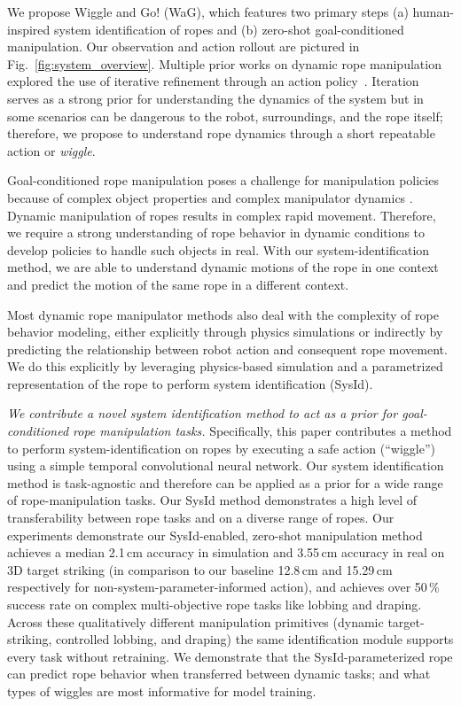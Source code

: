\documentclass[conference]{IEEEtran}
\newcommand{\waglong}{Wiggle and Go!}
\newcommand{\wag}{WaG}
\begin{document}
We propose \waglong{} (\wag{}), which features two primary steps (a) human-inspired system identification of ropes and (b) zero-shot goal-conditioned manipulation. Our observation and action rollout are pictured in Fig.~\ref{fig:system_overview}. Multiple prior works on dynamic rope manipulation explored the use of iterative refinement through an action policy~\cite{chi_iterative_2022, zhang_robots_2024}. Iteration serves as a strong prior for understanding the dynamics of the system but in some scenarios can be dangerous to the robot, surroundings, and the rope itself; therefore, we propose to understand rope dynamics through a short repeatable action or \emph{wiggle}.

Goal-conditioned rope manipulation poses a challenge for manipulation policies because of complex object properties and complex manipulator dynamics \cite{chi_iterative_2022}. Dynamic manipulation of ropes results in complex rapid movement. Therefore, we require a strong understanding of rope behavior in dynamic conditions to develop policies to handle such objects in real. With our system-identification method, we are able to understand dynamic motions of the rope in one context and predict the motion of the same rope in a different context.

Most dynamic rope manipulator methods also deal with the complexity of rope behavior modeling, either explicitly through physics simulations or indirectly by predicting the relationship between robot action and consequent rope movement. We do this explicitly by leveraging physics-based simulation and a parametrized representation of the rope to perform system identification (SysId).

\textit{We contribute a novel system identification method to act as a prior for goal-conditioned rope manipulation tasks.} Specifically, this paper contributes a method to perform system-identification on ropes by executing a safe action (``wiggle'') using a simple temporal convolutional neural network. Our system identification method is task-agnostic and therefore can be applied as a prior for a wide range of rope-manipulation tasks. Our SysId method demonstrates a high level of transferability between rope tasks and on a diverse range of ropes. Our experiments demonstrate our SysId-enabled, zero-shot manipulation method achieves a median 2.1\,cm accuracy in simulation and 3.55\,cm accuracy in real on 3D target striking (in comparison to our baseline 12.8\,cm and 15.29\,cm respectively for non-system-parameter-informed action), and achieves over 50\,\% success rate on complex multi-objective rope tasks like lobbing and draping. Across these qualitatively different manipulation primitives (dynamic target-striking, controlled lobbing, and draping) the same identification module supports every task without retraining. We demonstrate that the SysId-parameterized rope can predict rope behavior when transferred between dynamic tasks; and what types of wiggles are most informative for model training.
\end{document}
